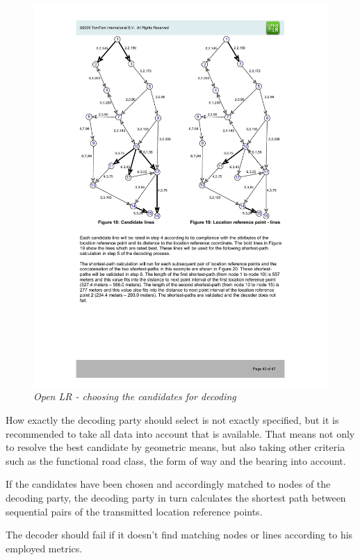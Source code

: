 \begin{figure}
  \includegraphics{fig/openlr-decoding-1.pdf}%
  \caption{\emph{Open LR - choosing the candidates for decoding}}%
  \label{fig:openlr-decoding-1}%
\end{figure}

How exactly the decoding party should select is not exactly specified, but it is recommended to take all data into account that is available. That means not only to resolve the best candidate by geometric means, but also taking other criteria such as the functional road class, the form of way and the bearing into account.

If the candidates have been chosen and accordingly matched to nodes of the decoding party, the decoding party in turn calculates the shortest path between sequential pairs of the transmitted location reference points.

The decoder should fail if it doesn't find matching nodes or lines according to his employed metrics.

